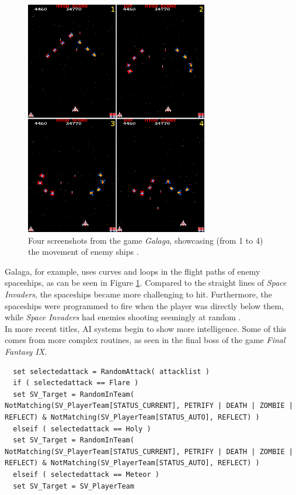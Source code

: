 \begin{figure}[H]
  \centering
  \includegraphics[width=8cm]{figures/ExampleGalaga.png}
  \caption{Four screenshots from the game \textit{Galaga}, showcasing (from 1 to 4) the movement of enemy ships \cite{galaga81}.}
  \label{fig:Galaga}
\end{figure}
Galaga, for example, uses curves and loops in the flight paths of enemy spaceships, as can be seen in Figure \ref{fig:Galaga}. Compared to the straight lines of \textit{Space Invaders}, the spaceships became more challenging to hit. Furthermore, the spaceships were programmed to fire when the player was directly below them, while \textit {Space Invaders} had enemies shooting seemingly at random \cite{schw04}.\\

In more recent titles, AI systems begin to show more intelligence. Some of this comes from more complex routines, as seen in the final boss of the game \textit{Final Fantasy IX}.

\begin{lstlisting}
  set selectedattack = RandomAttack( attacklist )
  if ( selectedattack == Flare )
  set SV_Target = RandomInTeam( NotMatching(SV_PlayerTeam[STATUS_CURRENT], PETRIFY | DEATH | ZOMBIE | REFLECT) & NotMatching(SV_PlayerTeam[STATUS_AUTO], REFLECT) )
  elseif ( selectedattack == Holy )
  set SV_Target = RandomInTeam( NotMatching(SV_PlayerTeam[STATUS_CURRENT], PETRIFY | DEATH | ZOMBIE | REFLECT) & NotMatching(SV_PlayerTeam[STATUS_AUTO], REFLECT) )
  elseif ( selectedattack == Meteor )
  set SV_Target = SV_PlayerTeam
\end{lstlisting}

